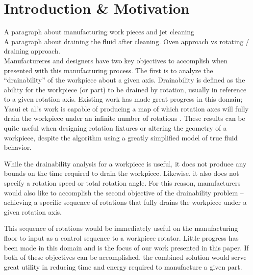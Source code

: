 							\chapter{Introduction \& Motivation}

A paragraph about manufacturing work pieces and jet cleaning
\\

A paragraph about draining the fluid after cleaning. Oven approach vs rotating / draining approach.
\\

Manufactureres and designers have two key objectives to accomplish when presented with this manufacturing process. The first is to analyze the ``drainability'' of the workpiece about a given axis. Drainability is defined as the ability for the workpiece (or part) to be drained by rotation, usually in reference to a given rotation axis. Existing work has made great progress in this domain; Yasui et al.'s work is capable of producing a map of which rotation axes will fully drain the workpiece under an infinite number of rotations \cite{plot}. These results can be quite useful when designing rotation fixtures or altering the geometry of a workpiece, despite the algorithm using a greatly simplified model of true fluid behavior.

While the drainability analysis for a workpiece is useful, it does not produce any bounds on the time required to drain the workpiece. Likewise, it also does not specify a rotation speed or total rotation angle. For this reason, manufacturers would also like to accomplish the second objective of the drainability problem -- achieving a specific sequence of rotations that fully drains the workpiece under a given rotation axis.

This sequence of rotations would be immediately useful on the manufacturing floor to input as a control sequence to a workpiece rotator. Little progress has been made in this domain and is the focus of our work presented in this paper. If both of these objectives can be accomplished, the combined solution would serve great utility in reducing time and energy required to manufacture a given part.

